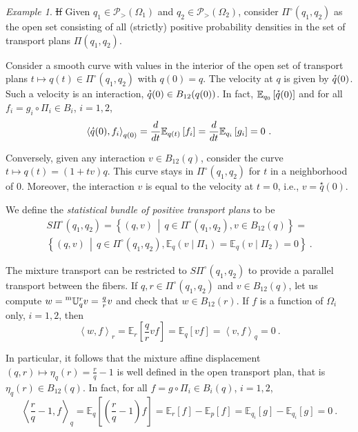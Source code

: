 \documentclass[axioms,article,submit,pdftex,moreauthors]{Definitions/mdpi}
\theoremstyle{plain}
\theoremstyle{remark}
\newtheorem{myexample}{Example}
\newcommand{\Expectation}{\mathbb E}
\newcommand{\condexpat}[3]{\Expectation_{#1}\left(#2 \middle| #3\right)}
\newcommand{\derivby}[1]{\frac{d}{d#1}}
\newcommand{\expectat}[2]{\Expectation_{#1}\left[#2\right]}
\newcommand{\mtransport}[2]{\prescript{\text{m}}{} {\mathbb U} _ {#1} ^ {#2}}
\newcommand{\pdensitieson}[1]{\mathcal P_{>}\left(#1\right)}
\newcommand{\scalarat}[3]{\left\langle#2,#3\right\rangle_{#1}}
\newcommand{\setof}[2]{\left\{#1 \, \middle| \, #2 \right\}}
\newcommand{\velocity}[1]{\accentset{\star}{#1}}
\begin{document}
\begin{myexample}
\st{If} Given $q_1 \in \pdensitieson{\Omega_1}$ and $q _ 2 \in  \pdensitieson {\Omega_2}$, consider $\Pi^\circ(q_1,q_2)$ as the open set consisting of all (strictly) positive probability densities in the set of transport plans $\Pi(q_1,q_2)$. 

Consider a smooth curve with values in the interior of the open set of transport plans \( t \mapsto q(t) \in \Pi^\circ(q_1, q_2) \) with \( q(0) = q \). The velocity at \( q \) is given by \( \velocity{q}(0) \). Such a velocity is an interaction, $\velocity q(0) \in B_{12}(q(0))$. In fact, $\expectat {q_0} {\velocity q(0)}$ and for all $f_i = g_i \circ \Pi_i \in B_i$, $i = 1,2$,
 \begin{equation*}
     \scalarat {q(0)} {\velocity q(0)} {f_i} = \derivby t \expectat {q(t)} {f_i} = \derivby t \expectat {q_i} {g_i} = 0 \ .
 \end{equation*}
 
Conversely, given any interaction \( v \in B_{12}(q) \), consider the curve \( t \mapsto q(t) = (1 + tv)q \). This curve stays in \( \Pi^\circ(q_1, q_2) \) for \( t \) in a neighborhood of 0. Moreover, the interaction \( v \) is equal to the velocity at \( t = 0 \), i.e., \( v = \overset{\star}{q}(0) \).
\end{myexample}

We define the \emph{statistical bundle of positive transport plans} to be 
     \begin{multline*} 
     S\Pi^\circ(q_1, q_2) = \setof{ (q, v)}{q \in \Pi^\circ(q_1, q_2), v \in B_{12}(q)} = \\ \setof{ (q, v)}{q \in \Pi^\circ(q_1, q_2), \condexpat q v {\Pi_1} = \condexpat q v {\Pi_2} = 0} \ .
     \end{multline*} 

The mixture transport can be restricted to $S\Pi^\circ(q_1, q_2)$ to provide a parallel transport between the fibers.  
If $q,r \in \Pi^\circ(q_1,q_2)$ and $v \in B_{12}(q)$, let us compute $w = \mtransport q r v = \frac q r v$ and check that $w \in B_{12}(r)$. If $f$ is a function of $\Omega_i$ only, $i = 1,2$, then 
\begin{equation*}
    \scalarat r w f = \expectat r {\frac q r v f} = \expectat q {v f} = \scalarat q v f = 0 \ .
\end{equation*}

In particular, it follows that the mixture affine displacement $(q,r) \mapsto \eta_q(r) = \frac r q - 1$ is well defined in the open transport plan, that is $\eta_q(r) \in B_{12}(q)$. In fact, for all $f = g \circ \Pi_i \in B_i(q)$, $i = 1,2$, 
\begin{equation*}
    \scalarat q {\frac r q - 1}{f} = \expectat q {\left(\frac r q -1 \right) f} = \expectat r f - \expectat p f = \expectat {q_i} {g} - \expectat {q_i} {g} = 0 \ .\end{equation*}
\end{document}
